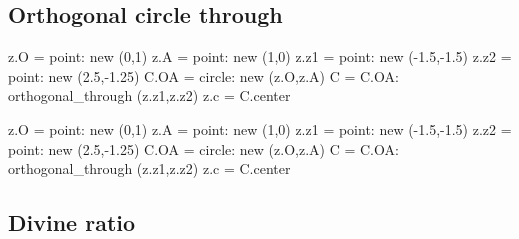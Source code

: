 \subsection{Orthogonal circle through} %
\label{sub:orthogonal_circle_through}
\begin{tkzexample}[latex=0cm,small,code only]
\begin{tkzelements}
   z.O   = point: new (0,1)
   z.A   = point: new (1,0)
   z.z1  = point: new (-1.5,-1.5)
   z.z2  = point: new (2.5,-1.25)
   C.OA  = circle: new (z.O,z.A)
   C     = C.OA: orthogonal_through (z.z1,z.z2)
   z.c   = C.center
\end{tkzelements}
\end{tkzexample}%

\begin{tkzelements}
   z.O   = point: new (0,1)
   z.A   = point: new (1,0)
   z.z1  = point: new (-1.5,-1.5)
   z.z2  = point: new (2.5,-1.25)
   C.OA  = circle: new (z.O,z.A)
   C = C.OA: orthogonal_through (z.z1,z.z2)
   z.c   = C.center
\end{tkzelements}

\hspace*{\fill}
\hspace*{\fill}

\subsection{Divine ratio} %
\label{sub:divine_ratio}

